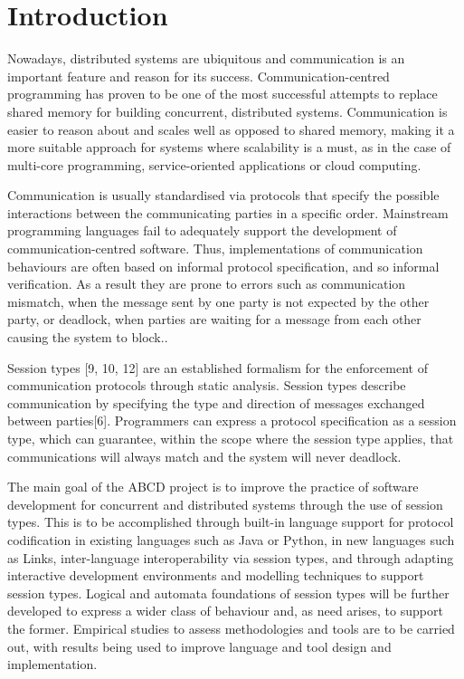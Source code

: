 \section{Introduction}


Nowadays, distributed systems are ubiquitous and communication is an important feature and reason for its success. Communication-centred programming has proven to be one of the most successful attempts to replace shared memory for building concurrent, distributed systems. Communication is easier to reason about and scales well as opposed to shared memory, making it a more suitable approach for systems where scalability is a must, as in the case of multi-core programming, service-oriented applications or cloud computing\cite{abcd}.

Communication is usually standardised via protocols that specify the possible interactions between the communicating parties in a specific order. Mainstream programming languages fail to adequately support the development of communication-centred software. Thus, implementations of communication behaviours are often based on informal protocol specification, and so informal verification. As a result they are prone to errors such as communication mismatch, when the message sent by one party is not expected by the other party, or deadlock, when parties are waiting for a message from each other causing the system to block.\cite{abcd}.


Session types [9, 10, 12] are an established formalism for the enforcement of communication protocols through static analysis. Session types describe communication by specifying the type and direction of messages exchanged between parties[6]. Programmers can express a protocol specification as a session type, which can guarantee, within the scope where the session type applies, that communications will always match and the system will never deadlock.

The main goal of the ABCD project\cite{abcd} is to improve the practice of software development for concurrent and distributed systems through the use of session types. This is to be accomplished through built-in language support for protocol codification in existing languages such as Java or Python, in new languages such as Links\cite{links}, inter-language interoperability via session types, and through adapting interactive development environments and modelling techniques to support session types. Logical and automata foundations of session types will be further developed to express a wider class of behaviour and, as need arises, to support the former. Empirical studies to assess methodologies and tools are to be carried out, with results being used to improve language and tool design and implementation.


